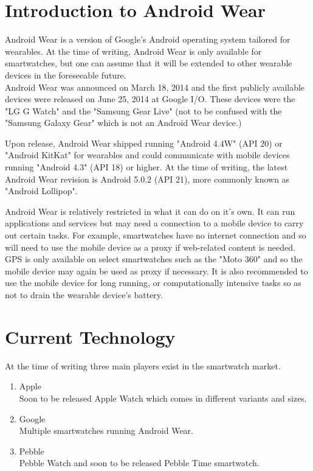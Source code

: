 \section{Introduction to Android Wear}

Android Wear is a version of Google's Android operating system tailored for
wearables. At the time of writing, Android Wear is only available for
smartwatches, but one can assume that it will be extended to other wearable
devices in the foreseeable future.\\
Android Wear was announced on March 18, 2014 and the first publicly available
devices were released on June 25, 2014 at Google I/O. These devices were the
"LG G Watch" and the "Samsung Gear Live" (not to be confused with the
"Samsung Galaxy Gear" which is not an Android Wear device.)

Upon release, Android Wear shipped running "Android 4.4W" (API 20) or "Android
KitKat" for wearables and could communicate with mobile devices running
"Android 4.3" (API 18) or higher. At the time of writing, the latest Android
Wear revision is Android 5.0.2 (API 21), more commonly known as "Android
Lollipop".

Android Wear is relatively restricted in what it can do on it's own. It can run
applications and services but may need a connection to a mobile device to carry
out certain tasks. For example, smartwatches have no internet connection and so
will need to use the mobile device as a proxy if web-related content is needed.
GPS is only available on select smartwatches such as the "Moto 360" and so the
mobile device may again be used as proxy if necessary.
It is also recommended to use the mobile device for long running, or
computationally intensive tasks so as not to drain the wearable device's
battery.

\section{Current Technology}

At the time of writing three main players exist in the smartwatch market.
\begin{enumerate}
\item Apple\\
    Soon to be released Apple Watch which comes in different variants and sizes.
\item Google\\
    Multiple smartwatches running Android Wear.
\item Pebble\\
    Pebble Watch and soon to be released Pebble Time smartwatch.
\end{enumerate}

